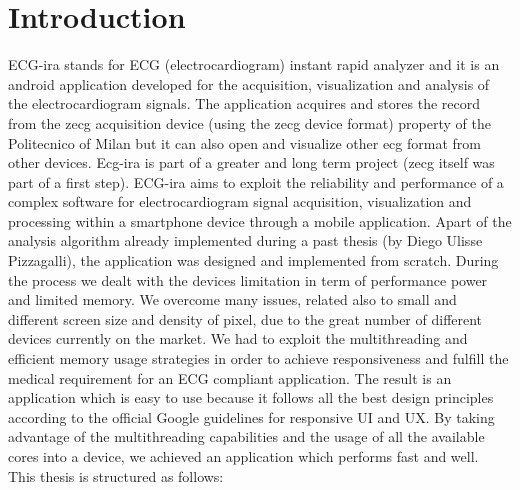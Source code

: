 
\chapter{Introduction}
\label{Chapter1} 

ECG-ira stands for ECG (electrocardiogram) instant rapid analyzer and it is an android application developed for the acquisition, visualization and analysis of the electrocardiogram signals. The application acquires and stores  the record from the zecg acquisition device  (using the zecg device format) property of the Politecnico of Milan but it can also open and visualize other ecg format from other  devices. Ecg-ira is part of a greater and long term project (zecg itself was part of a first step). ECG-ira aims to exploit the reliability and performance of a complex software for electrocardiogram signal acquisition,  visualization  and processing within a smartphone device through a mobile application. Apart of the analysis algorithm already implemented during a past thesis (by Diego Ulisse Pizzagalli), the application was designed and implemented from scratch. During the process we dealt with the devices limitation in term of performance power and limited memory. We overcome many issues, related also to small and different screen size and density of pixel, due to the great number of different devices currently on the market. We had to exploit the multithreading and efficient memory usage strategies in order to achieve responsiveness and fulfill the medical requirement for an ECG compliant application. The result is an application which is easy to use because it follows all the best design principles according to the official Google guidelines for responsive UI and UX. By taking advantage of the multithreading capabilities and the usage of all the available cores into a device, we achieved an application which performs fast and well.\\
This thesis is structured as follows: 
